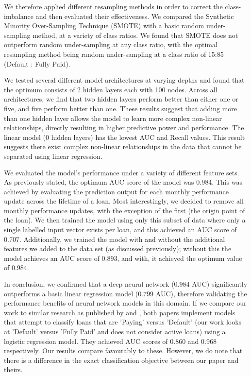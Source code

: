 We therefore applied different resampling methods in order to correct the class-imbalance and then evaluated their effectiveness. We compared the Synthetic Minority Over-Sampling Technique (SMOTE) with a basic random under-sampling method, at a variety of class ratios. We found that SMOTE does not outperform random under-sampling at any class ratio, with the optimal resampling method being random under-sampling at a class ratio of 15:85 (Default : Fully Paid).

We tested several different model architectures at varying depths and found that the optimum consists of 2 hidden layers each with 100 nodes. Across all architectures, we find that two hidden layers perform better than either one or five, and five perform better than one. These results suggest that adding more than one hidden layer allows the model to learn more complex non-linear relationships, directly resulting in higher predictive power and performance. The linear model (0 hidden layers) has the lowest AUC and Recall values. This result suggests there exist complex non-linear relationships in the data that cannot be separated using linear regression. 

We evaluated the model's performance under a variety of different feature sets. As previously stated, the optimum AUC score of the model was 0.984. This was achieved by evaluating the prediction output for each monthly performance update across the lifetime of a loan. Most interestingly, we decided to remove all monthly performance updates, with the exception of the first (the origin point of the loan). We then trained the model using only this subset of data where only a single labelled input vector exists per loan, and this achieved an AUC score of 0.707. Additionally, we trained the model with and without the additional features we added to the data set (as discussed previously); without this the model achieves an AUC score of 0.893, and with, it achieved the optimum value of 0.984.      

In conclusion, we confirmed that a deep neural network (0.984 AUC) significantly outperforms a basic linear regression model (0.799 AUC), therefore validating the performance benefits of neural network models in this domain. If we compare our work to similar research as published by \cite{similar_paper_bagherpour} and \cite{similar_paper_deng}, both papers implement models that attempt to classify loans that are 'Paying' versus 'Default' (our work looks at 'Default' versus 'Fully Paid' and does not consider active loans) using a logistic regression model. They achieved AUC scores of 0.860 and 0.968 respectively. Our results compare favourably to these. However, we do note that there is a difference in the exact classification objective between our paper and theirs. 

